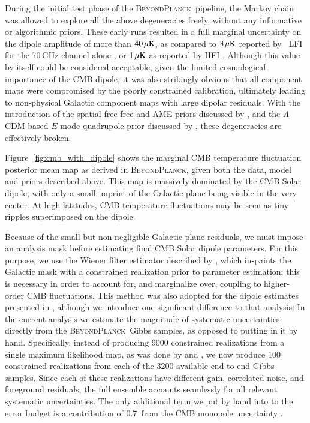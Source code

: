 \documentclass[twocolumn]{aa}
\newcommand{\BP}{\textsc{BeyondPlanck}}
\begin{document}
During the initial test phase of the \BP\ pipeline, the Markov chain
was allowed to explore all the above degeneracies freely, without any
informative or algorithmic priors. These early runs resulted in a full
marginal uncertainty on the dipole amplitude of more than $40\muK$, as
compared to $3\muK$ reported by \Planck\ LFI for the 70\,GHz channel
alone \citep{planck2016-l02}, or $1\muK$ as reported by HFI
\citep{planck2016-l03}. Although this value by itself could be
considered acceptable, given the limited cosmological importance of
the CMB dipole, it was also strikingly obvious that all component maps
were compromised by the poorly constrained calibration, ultimately
leading to non-physical Galactic component maps with large
dipolar residuals. With the introduction of the spatial free-free and
AME priors discussed by \citet{bp13}, and the $\Lambda$CDM-based
$E$-mode quadrupole prior discussed by \citet{bp07}, these
degeneracies are effectively broken.

Figure~\ref{fig:cmb_with_dipole} shows the marginal CMB temperature
fluctuation posterior mean map as derived in \BP, given both the
data, model and priors described above. This map is massively
dominated by the CMB Solar dipole, with only a small imprint of the
Galactic plane being visible in the very center. At high latitudes,
CMB temperature fluctuations may be seen as tiny ripples superimposed
on the dipole.

Because of the small but non-negligible Galactic plane residuals, we
must impose an analysis mask before estimating final CMB Solar dipole
parameters. For this purpose, we use the Wiener filter estimator
described by \citet{thommesen:2019}, which in-paints the Galactic mask
with a constrained realization prior to parameter estimation; this is
necessary in order to account for, and marginalize over, coupling to
higher-order CMB fluctuations. This method was also adopted for the
dipole estimates presented in \citet{planck2020-LVII}, although we
introduce one significant difference to that analysis: In the current
analysis we estimate the magnitude of systematic uncertainties
directly from the \BP\ Gibbs samples, as opposed to putting in it by
hand. Specifically, instead of producing 9000 constrained realizations
from a single maximum likelihood map, as was done by
\citet{thommesen:2019} and \citet{planck2020-LVII}, we now produce 100
constrained realizations from each of the 3200 available end-to-end
Gibbs samples. Since each of these realizations have different gain,
correlated noise, and foreground residuals, the full ensemble accounts
seamlessly for all relevant systematic uncertainties. The only
additional term we put by hand into to the error budget is a
contribution of 0.7\muK\ from the CMB monopole uncertainty
\citep{fixsen2009}.
\end{document}
